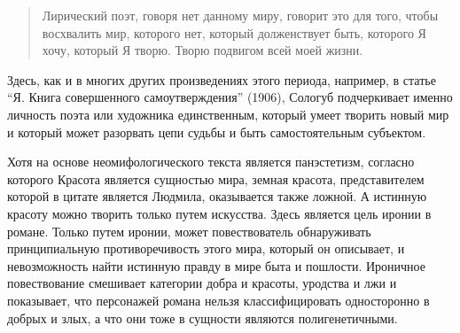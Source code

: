 \documentclass[12pt,a4paper]{article}
\begin{document}
\begin{quote}
 Лирический поэт, говоря нет данному миру, говорит это для того, чтобы восхвалить мир, которого нет, который долженствует быть, которого Я хочу, который Я творю. Творю подвигом всей моей жизни.

\parencite[170.]{sologub1991}
 \end{quote}

 Здесь, как и в многих других произведениях этого периода, например, в статье \enquote{Я. Книга совершенного самоутверждения} (1906),  Сологуб подчеркивает именно личность поэта или художника единственным, который умеет творить новый мир и который может разорвать цепи судьбы и быть самостоятельным субъектом.


Хотя на основе неомифологического текста является панэстетизм, согласно которого Красота является сущностью мира, земная красота, представителем которой в цитате является Людмила, оказывается также ложной. А истинную красоту можно творить только путем искусства. Здесь является цель иронии в романе. Только путем иронии, может повествователь обнаруживать принципиальную противоречивость этого мира, который он описывает, и невозможность найти истинную правду в мире быта и пошлости. Ироничное повествование смешивает категории добра и красоты, уродства и лжи и показывает, что персонажей романа нельзя классифицировать односторонно в добрых и злых, а что они тоже в сущности являются полигенетичными.







\end{document}
